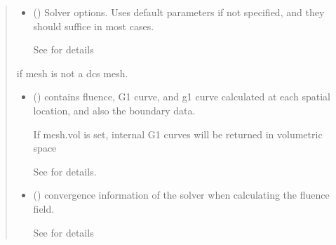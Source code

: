 \documentclass[letterpaper,10pt,english]{sphinxmanual}
\begin{document}
\begin{fulllineitems}
\begin{quote}
\begin{description}
\begin{itemize}
\item {} 
\sphinxAtStartPar
{} ({\hyperref[\detokenize{_autosummary/nirfasterff.utils.SolverOptions:nirfasterff.utils.SolverOptions}]{}}\sphinxstyleliteralemphasis{\sphinxupquote{, }}) \textendash{} 
\sphinxAtStartPar
Solver options. Uses default parameters if not specified, and they should suffice in most cases.

\sphinxAtStartPar
See {\hyperref[\detokenize{_autosummary/nirfasterff.utils.SolverOptions:nirfasterff.utils.SolverOptions}]{}} for details


\end{itemize}

\sphinxAtStartPar
{} \textendash{} if mesh is not a dcs mesh.

\sphinxAtStartPar
\begin{itemize}
\item {} 
\sphinxAtStartPar
{} () \textendash{} contains fluence, G1 curve, and g1 curve calculated at each spatial location, and also the boundary data.

\sphinxAtStartPar
If mesh.vol is set, internal G1 curves will be returned in volumetric space

\sphinxAtStartPar
See {\hyperref[\detokenize{_autosummary/nirfasterff.base.data.DCSdata:nirfasterff.base.data.DCSdata}]{}} for details.

\item {} 
\sphinxAtStartPar
{} () \textendash{} convergence information of the solver when calculating the fluence field.

\sphinxAtStartPar
See {\hyperref[\detokenize{_autosummary/nirfasterff.utils.ConvergenceInfo:nirfasterff.utils.ConvergenceInfo}]{}} for details

\end{itemize}


\end{description}\end{quote}



\end{fulllineitems}
\end{document}
